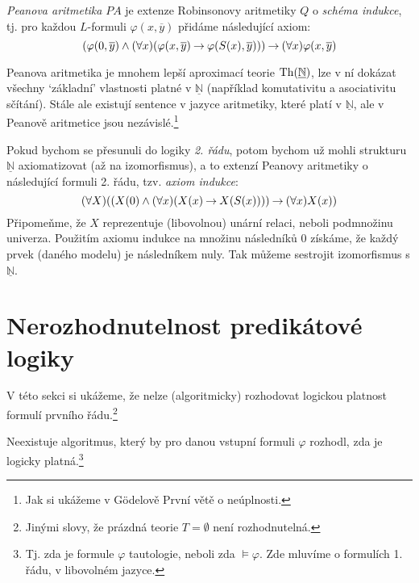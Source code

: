 \begin{definition}
\emph{Peanova aritmetika} $PA$ je extenze Robinsonovy  aritmetiky $Q$ o \emph{schéma indukce}, tj. pro každou $L$-formuli $\varphi(x,\overline{y})$ přidáme následující axiom:
$$
(\varphi(0,\overline{y}) \land (\forall x)(\varphi(x,\overline{y})\mathbin{\rightarrow} \varphi(S(x),\overline{y}))) \mathbin{\rightarrow} (\forall x)\varphi(x,\overline{y})
$$
\end{definition}

Peanova aritmetika je mnohem lepší aproximací teorie $\operatorname{Th}(\underline{\mathbb N})$, lze v ní dokázat všechny `základní' vlastnosti platné v $\underline{\mathbb N}$ (například komutativitu a asociativitu sčítání). Stále ale existují sentence v jazyce aritmetiky, které platí v $\underline{\mathbb N}$, ale v Peanově aritmetice jsou nezávislé.\footnote{Jak si ukážeme v Gödelově První větě o neúplnosti.} 

\begin{remark}
Pokud bychom se přesunuli do logiky \emph{2. řádu}, potom bychom už mohli strukturu $\underline{\mathbb N}$ axiomatizovat (až na izomorfismus), a to extenzí Peanovy aritmetiky o následující formuli 2. řádu, tzv. \emph{axiom indukce}:
$$
(\forall X)((X(0) \land (\forall x)(X(x) \mathbin{\rightarrow} X(S(x)))) \mathbin{\rightarrow} (\forall x)X(x))
$$
Připomeňme, že $X$ reprezentuje (libovolnou) unární relaci, neboli podmnožinu univerza. Použitím axiomu indukce na množinu následníků 0 získáme, že každý prvek (daného modelu) je následníkem nuly. Tak můžeme sestrojit izomorfismus s $\underline{\mathbb N}$.
\end{remark}

\section{Nerozhodnutelnost predikátové logiky}
    
V této sekci si ukážeme, že nelze (algoritmicky) rozhodovat logickou platnost formulí prvního řádu.\footnote{Jinými slovy, že prázdná teorie $T=\emptyset$ není rozhodnutelná.}

\begin{theorem}\label{theorem:undecidability-of-predicate-logic}
Neexistuje algoritmus, který by pro danou vstupní formuli $\varphi$ rozhodl, zda je logicky platná.\footnote{Tj. zda je formule $\varphi$ tautologie, neboli zda $\models\varphi$. Zde mluvíme o formulích 1. řádu, v libovolném jazyce.}
\end{theorem}

